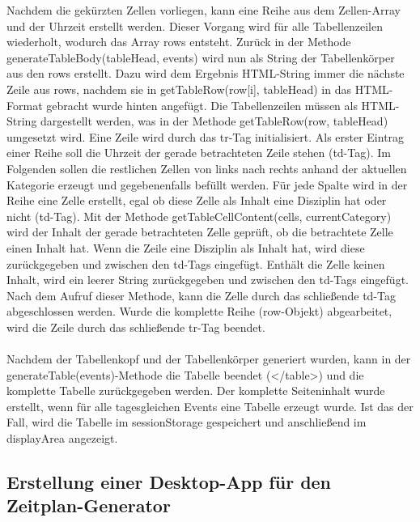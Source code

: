 {Nachdem die gekürzten Zellen vorliegen, kann eine Reihe aus dem Zellen-Array und der Uhrzeit erstellt werden. Dieser Vorgang wird für alle Tabellenzeilen wiederholt, wodurch das Array rows entsteht.
Zurück in der Methode generateTableBody(tableHead, events) wird nun als String der Tabellenkörper aus den rows erstellt. Dazu wird dem Ergebnis HTML-String immer die nächste Zeile aus rows, nachdem sie in getTableRow(row[i], tableHead) in das HTML-Format gebracht wurde hinten angefügt.
Die Tabellenzeilen müssen als HTML-String dargestellt werden, was in der Methode getTableRow(row, tableHead) umgesetzt wird. Eine Zeile wird durch das tr-Tag initialisiert. Als erster Eintrag einer Reihe soll die Uhrzeit der gerade betrachteten Zeile stehen (td-Tag). Im Folgenden sollen die restlichen Zellen von links nach rechts anhand der aktuellen Kategorie erzeugt und gegebenenfalls befüllt werden. Für jede Spalte wird in der Reihe eine Zelle erstellt, egal ob diese Zelle als Inhalt eine Disziplin hat oder nicht (td-Tag). Mit der Methode getTableCellContent(cells, currentCategory) wird der Inhalt der gerade betrachteten Zelle geprüft, ob die betrachtete Zelle einen Inhalt hat. Wenn die Zeile eine Disziplin als Inhalt hat, wird diese zurückgegeben und zwischen den td-Tags eingefügt. Enthält die Zelle keinen Inhalt, wird ein leerer String zurückgegeben und zwischen den td-Tags eingefügt. Nach dem Aufruf dieser Methode, kann die Zelle durch das schließende td-Tag abgeschlossen werden. Wurde die komplette Reihe (row-Objekt) abgearbeitet, wird die Zeile durch das schließende tr-Tag beendet. \\
\\
Nachdem der Tabellenkopf und der Tabellenkörper generiert wurden, kann in der generateTable(events)-Methode die Tabelle beendet (</table>) und die komplette Tabelle zurückgegeben werden.
Der komplette Seiteninhalt wurde erstellt, wenn für alle tagesgleichen Events eine Tabelle erzeugt wurde. Ist das der Fall, wird die Tabelle im sessionStorage gespeichert und anschließend im displayArea angezeigt.

\subsection{Erstellung einer Desktop-App für den Zeitplan-Generator}

}
